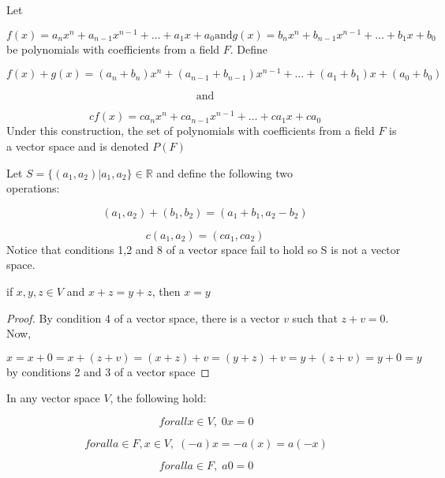 \begin{example}
		Let

\[
f(x) = a_{n}x^{n} + a_{n-1}x^{n-1} +\dots+ a_{1}x + a_{0} \text{and} g(x) = b_{n}x^{n} + b_{n-1}x^{n-1} +\dots+ b_{1}x + b_{0}
\]
		be polynomials with coefficients from a field \(F\). Define

\[
f(x)+g(x) = (a_{n}+b_{n})x^{n}+(a_{n-1}+b_{n-1})x^{n-1}+\dots+(a_{1}+b_{1})x+(a_{0}+b_{0})
\]

\[
\text{and}
\]

\[
cf(x) = ca_{n}x^{n}+ca_{n-1}x^{n-1}+\dots+ca_{1}x+ca_{0}
\]
		 Under this construction, the set of polynomials with coefficients from a field \(F\) is a vector space and is denoted \(P(F)\)

\end{example}


\begin{example}
		Let \(S = \{(a_{1}, a_{2})|a_{1}, a_{2}\} \in \mathbb{R}\) and define the following two\\
 operations:

\[
(a_{1}, a_{2}) + (b_{1}, b_{2}) = (a_{1} + b_{1}, a_{2} - b_{2})
\]

\[
c(a_{1}, a_{2}) = (ca_{1}, ca_{2})
\]
		Notice that conditions 1,2 and 8 of a vector space fail to hold so S is not a vector space.

\end{example}


\begin{theorem}
		if \(x,y,z\in V\) and \(x+z = y+z\), then \(x = y\)

\begin{proof}
			By condition 4 of a vector space, there is a vector \(v\) such that \(z+v = 0\). Now,

\[
x = x + 0 = x + (z + v) = (x + z) + v = (y + z) + v = y + (z + v) = y + 0 = y
\]
			by conditions 2 and 3 of a vector space

\end{proof}

\end{theorem}


\begin{theorem}
		In any vector space \(V\), the following hold:

\[
\ forall x \in V, \; 0x = 0
\]

\[
\ forall a\in F, x \in V, \; (-a)x = -a(x) = a(-x)
\]

\[
\ forall a\in F, \; a0 = 0
\]

\end{theorem}

